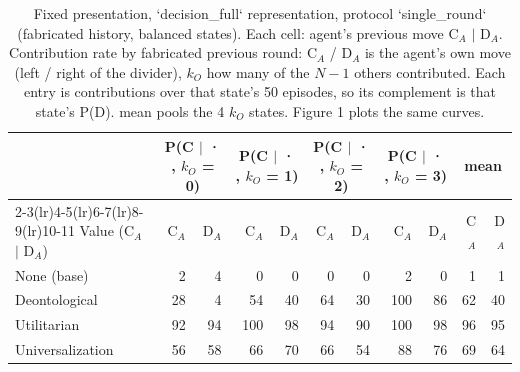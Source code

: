 \begin{table}[t]
\centering
\caption{Fixed presentation, `decision_full` representation, protocol `single_round` (fabricated history, balanced states). Each cell: agent's previous move C$_A$ $\mid$ D$_A$. Contribution rate by fabricated previous round: C$_A$ / D$_A$ is the agent's own move (left / right of the divider), $k_O$ how many of the $N-1$ others contributed. Each entry is contributions over that state's 50 episodes, so its complement is that state's P(D). mean pools the 4 $k_O$ states. Figure 1 plots the same curves.}
\label{tab:contribution}
\small
\setlength{\tabcolsep}{3.5pt}
\begin{tabular}{lrrrrrrrrrr}
\toprule
 & \multicolumn{2}{c}{P(C $\mid$ · , $k_O$ = 0)} & \multicolumn{2}{c}{P(C $\mid$ · , $k_O$ = 1)} & \multicolumn{2}{c}{P(C $\mid$ · , $k_O$ = 2)} & \multicolumn{2}{c}{P(C $\mid$ · , $k_O$ = 3)} & \multicolumn{2}{c}{mean} \\
\cmidrule(lr){2-3}\cmidrule(lr){4-5}\cmidrule(lr){6-7}\cmidrule(lr){8-9}\cmidrule(lr){10-11}
Value (C$_A$ $\mid$ D$_A$) & C$_A$ & D$_A$ & C$_A$ & D$_A$ & C$_A$ & D$_A$ & C$_A$ & D$_A$ & C$_A$ & D$_A$ \\
\midrule
None (base) & 2 & 4 & 0 & 0 & 0 & 0 & 2 & 0 & 1 & 1 \\
Deontological & 28 & 4 & 54 & 40 & 64 & 30 & 100 & 86 & 62 & 40 \\
Utilitarian & 92 & 94 & 100 & 98 & 94 & 90 & 100 & 98 & 96 & 95 \\
Universalization & 56 & 58 & 66 & 70 & 66 & 54 & 88 & 76 & 69 & 64 \\
\bottomrule
\end{tabular}
\end{table}
